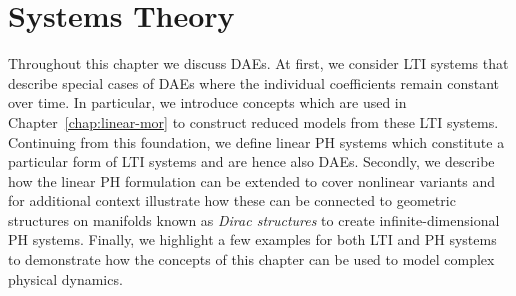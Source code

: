\chapter{Systems Theory}\label{chap:systems-theory}

Throughout this chapter we discuss \acp{DAE}.
At first, we consider \ac{LTI} systems that describe special cases of \acp{DAE} where the individual coefficients remain constant over time.
In particular, we introduce concepts which are used in Chapter~\ref{chap:linear-mor} to construct reduced models from these \ac{LTI} systems.
Continuing from this foundation, we define linear \ac{PH} systems which constitute a particular form of \ac{LTI} systems and are hence also \acp{DAE}.
Secondly, we describe how the linear \ac{PH} formulation can be extended to cover nonlinear variants and for additional context illustrate how these can be connected to geometric structures on manifolds known as \emph{Dirac structures} to create infinite-dimensional \ac{PH} systems.
Finally, we highlight a few examples for both \ac{LTI} and \ac{PH} systems to demonstrate how the concepts of this chapter can be used to model complex physical dynamics.




